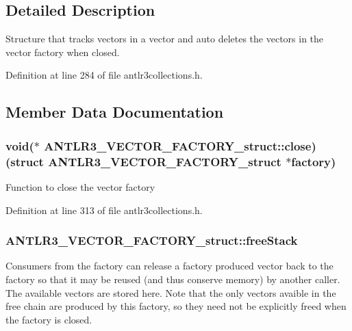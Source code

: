 \subsection{Detailed Description}
Structure that tracks vectors in a vector and auto deletes the vectors in the vector factory when closed. 

Definition at line 284 of file antlr3collections.\-h.



\subsection{Member Data Documentation}
\hypertarget{struct_a_n_t_l_r3___v_e_c_t_o_r___f_a_c_t_o_r_y__struct_a83818d3064adb58578fe4ad0567fd753}{
\subsubsection[{close}]{\setlength{\rightskip}{0pt plus 5cm}void($\ast$ A\-N\-T\-L\-R3\-\_\-\-V\-E\-C\-T\-O\-R\-\_\-\-F\-A\-C\-T\-O\-R\-Y\-\_\-struct\-::close)(struct {\bf A\-N\-T\-L\-R3\-\_\-\-V\-E\-C\-T\-O\-R\-\_\-\-F\-A\-C\-T\-O\-R\-Y\-\_\-struct} $\ast$factory)}}\label{struct_a_n_t_l_r3___v_e_c_t_o_r___f_a_c_t_o_r_y__struct_a83818d3064adb58578fe4ad0567fd753}
Function to close the vector factory 

Definition at line 313 of file antlr3collections.\-h.

\hypertarget{struct_a_n_t_l_r3___v_e_c_t_o_r___f_a_c_t_o_r_y__struct_acd0f61708f1e39b2e88fe63dfc73abd1}{
\subsubsection[{free\-Stack}]{ A\-N\-T\-L\-R3\-\_\-\-V\-E\-C\-T\-O\-R\-\_\-\-F\-A\-C\-T\-O\-R\-Y\-\_\-struct\-::free\-Stack}}\label{struct_a_n_t_l_r3___v_e_c_t_o_r___f_a_c_t_o_r_y__struct_acd0f61708f1e39b2e88fe63dfc73abd1}
Consumers from the factory can release a factory produced vector back to the factory so that it may be reused (and thus conserve memory) by another caller. The available vectors are stored here. Note that the only vectors avaible in the free chain are produced by this factory, so they need not be explicitly freed when the factory is closed. 


